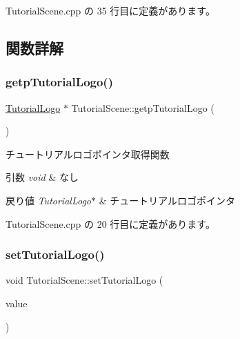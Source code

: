  Tutorial\+Scene.\+cpp の 35 行目に定義があります。



\subsection{関数詳解}
\mbox{\label{class_tutorial_scene_a9f1a224f8864ccd5ddfe5a8c894a4582}} 
\subsubsection{\texorpdfstring{getp\+Tutorial\+Logo()}{getpTutorialLogo()}}
{\footnotesize\ttfamily \mbox{\hyperlink{class_tutorial_logo}{Tutorial\+Logo}} $\ast$ Tutorial\+Scene\+::getp\+Tutorial\+Logo (\begin{DoxyParamCaption}{ }\end{DoxyParamCaption})}



チュートリアルロゴポインタ取得関数 


\begin{DoxyParams}{引数}
{\em void} & なし \\
\hline
\end{DoxyParams}

\begin{DoxyRetVals}{戻り値}
{\em Tutorial\+Logo$\ast$} & チュートリアルロゴポインタ \\
\hline
\end{DoxyRetVals}


 Tutorial\+Scene.\+cpp の 20 行目に定義があります。

\mbox{\label{class_tutorial_scene_a7c8b448ac848d4811e448acf45c5a48e}} 
\subsubsection{\texorpdfstring{set\+Tutorial\+Logo()}{setTutorialLogo()}}
{\footnotesize\ttfamily void Tutorial\+Scene\+::set\+Tutorial\+Logo (\begin{DoxyParamCaption}\item[{\mbox{\hyperlink{class_tutorial_logo}{Tutorial\+Logo}} $\ast$}]{value }\end{DoxyParamCaption})}



